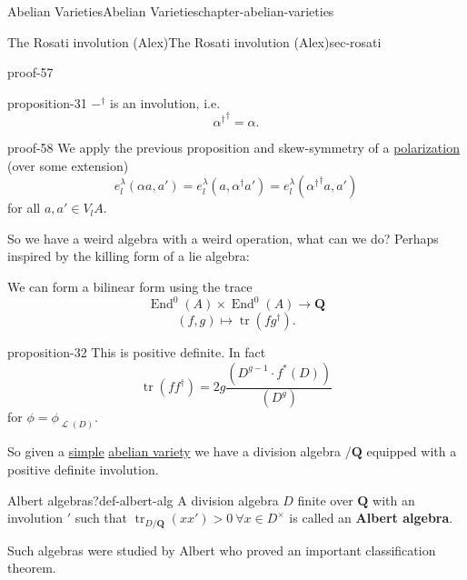 \documentclass[oneside,10pt,]{book}
\newcommand{\terminology}[1]{\textbf{#1}}
\numberwithin{equation}{section}
\newcommand{\sheaf}[1]{\operatorname{\mathcal{#1}}}
\newcommand{\QQ}{\mathbf{Q}}
\DeclareMathOperator{\End}{End}
\DeclareMathOperator{\tr}{tr}
\begin{document}
\begin{chapterptx}{Abelian Varieties}{}{Abelian Varieties}{}{}{chapter-abelian-varieties}
\begin{sectionptx}{The Rosati involution (Alex)}{}{The Rosati involution (Alex)}{}{}{sec-rosati}
\begin{proofptx}{}{proof-57}
\begin{equation*}
\end{equation*}
%
\end{proofptx}
\begin{proposition}{}{}{proposition-31}%
\hypertarget{p-338}{}%
\(-^\dagger\) is an involution, i.e.%
\begin{equation*}
{\alpha^\dagger}^{\dagger} = \alpha\text{.}
\end{equation*}
%
\end{proposition}
\begin{proofptx}{}{proof-58}
\hypertarget{p-339}{}%
We apply the previous proposition and skew-symmetry of a \hyperref[def-c-pol]{polarization} (over some extension)%
\begin{equation*}
e_l^\lambda(\alpha a,a') = e_l^\lambda(a, \alpha^\dagger a') = e_l^\lambda({\alpha^\dagger}^{\dagger} a, a')
\end{equation*}
for all \(a,a'\in V_l A\).%
\end{proofptx}
\hypertarget{p-340}{}%
So we have a weird algebra with a weird operation, what can we do? Perhaps inspired by the killing form of a lie algebra:%
\par
\hypertarget{p-341}{}%
We can form a bilinear form using the trace%
\begin{equation*}
\End^0(A) \times \End^0(A) \to \QQ
\end{equation*}
%
\begin{equation*}
(f,g) \mapsto \tr(fg^\dagger)\text{.}
\end{equation*}
%
\begin{proposition}{}{}{proposition-32}%
\hypertarget{p-342}{}%
This is positive definite. In fact%
\begin{equation*}
\tr(ff^\dagger) = 2g\frac{(D^{g-1}\cdot f^*(D))}{(D^g)}
\end{equation*}
for \(\phi = \phi_{\sheaf L(D)}\).%
\end{proposition}
\hypertarget{p-343}{}%
So given a \hyperref[def-simple-av]{simple} \hyperref[def-buntes-abvar]{abelian variety} we have a division algebra  \(/ \QQ\) equipped with  a positive definite involution.%
\begin{definition}{Albert algebras?}{def-albert-alg}%
\hypertarget{p-344}{}%
A division algebra \(D\) finite over \(\QQ\) with an involution \('\) such that \(\tr_{D/\QQ}(xx') > 0\ \forall x\in D^\times\) is called an \terminology{Albert algebra}.%
\end{definition}
\hypertarget{p-345}{}%
Such algebras were studied by Albert who proved an important classification theorem.%

\end{sectionptx}
\end{chapterptx}
\end{document}
